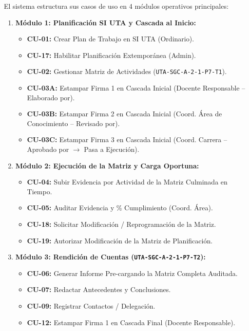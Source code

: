 \documentclass[12pt,a4paper]{article}
\begin{document}
El sistema estructura sus casos de uso en 4 módulos operativos principales:
\begin{enumerate}[leftmargin=1.5em, itemsep=2pt]
    \item \textbf{Módulo 1: Planificación SI UTA y Cascada al Inicio:}
    \begin{itemize}[leftmargin=1.2em]
        \item \textbf{CU-01:} Crear Plan de Trabajo en SI UTA (Ordinario).
        \item \textbf{CU-17:} Habilitar Planificación Extemporánea (Admin).
        \item \textbf{CU-02:} Gestionar Matriz de Actividades (\texttt{UTA-SGC-A-2-1-P7-T1}).
        \item \textbf{CU-03A:} Estampar Firma 1 en Cascada Inicial (Docente Responsable -- Elaborado por).
        \item \textbf{CU-03B:} Estampar Firma 2 en Cascada Inicial (Coord. Área de Conocimiento -- Revisado por).
        \item \textbf{CU-03C:} Estampar Firma 3 en Cascada Inicial (Coord. Carrera -- Aprobado por $\rightarrow$ Pasa a Ejecución).
    \end{itemize}
    \item \textbf{Módulo 2: Ejecución de la Matriz y Carga Oportuna:}
    \begin{itemize}[leftmargin=1.2em]
        \item \textbf{CU-04:} Subir Evidencia por Actividad de la Matriz Culminada en Tiempo.
        \item \textbf{CU-05:} Auditar Evidencia y \% Cumplimiento (Coord. Área).
        \item \textbf{CU-18:} Solicitar Modificación / Reprogramación de la Matriz.
        \item \textbf{CU-19:} Autorizar Modificación de la Matriz de Planificación.
    \end{itemize}
    \item \textbf{Módulo 3: Rendición de Cuentas (\texttt{UTA-SGC-A-2-1-P7-T2}):}
    \begin{itemize}[leftmargin=1.2em]
        \item \textbf{CU-06:} Generar Informe Pre-cargando la Matriz Completa Auditada.
        \item \textbf{CU-07:} Redactar Antecedentes y Conclusiones.
        \item \textbf{CU-09:} Registrar Contactos / Delegación.
        \item \textbf{CU-12:} Estampar Firma 1 en Cascada Final (Docente Responsable).

\end{itemize}
\end{enumerate}
\end{document}
